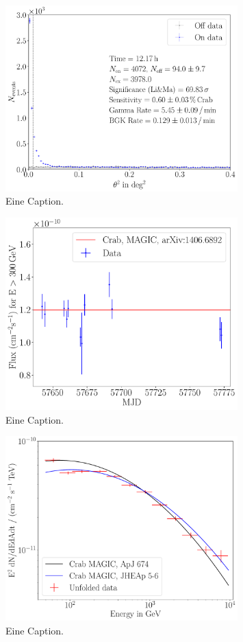 \begin{figure}
  \centering
  \includegraphics[width=0.8\textwidth]{figures/odie_thetasquared.pdf}
  \caption{Eine Caption.}
\end{figure}

\begin{figure}
  \centering
  \includegraphics[width=0.8\textwidth]{figures/flute_lichtkurve.pdf}
  \caption{Eine Caption.}
\end{figure}

\begin{figure}
  \centering
  \includegraphics[width=0.8\textwidth]{figures/combunfold_energyspectrum.pdf}
  \caption{Eine Caption.}
\end{figure}
